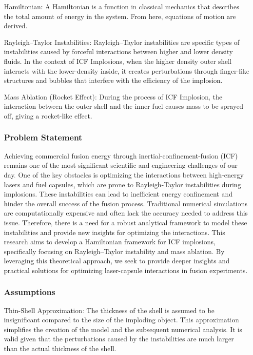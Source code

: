 \par Hamiltonian:
A Hamiltonian is a function in classical mechanics that describes the total amount of energy in the system. From here, equations of motion are derived.

\par Rayleigh--Taylor Instabilities:
Rayleigh--Taylor instabilities are specific types of instabilities caused by forceful interactions between higher and lower density fluids. In the context of ICF Implosions, when the higher density outer shell interacts with the lower-density inside, it creates perturbations through finger-like structures and bubbles that interfere with the efficiency of the implosion.

\par Mass Ablation (Rocket Effect):
During the process of ICF Implosion, the interaction between the outer shell and the inner fuel causes mass to be sprayed off, giving a rocket-like effect.



\subsubsection{Problem Statement}
\par Achieving commercial fusion energy through inertial-confinement-fusion (ICF) remains one of the most significant scientific and engineering challenges of our day. One of the key obstacles is optimizing the interactions between high-energy lasers and fuel capsules, which are prone to Rayleigh-Taylor instabilities during implosions. These instabilities can lead to inefficient energy confinement and hinder the overall success of the fusion process. Traditional numerical simulations are computationally expensive and often lack the accuracy needed to address this issue. Therefore, there is a need for a robust analytical framework to model these instabilities and provide new insights for optimizing the interactions. This research aims to develop a Hamiltonian framework for ICF implosions, specifically focusing on Rayleigh--Taylor instability and mass ablation. By leveraging this theoretical approach, we seek to provide deeper insights and practical solutions for optimizing laser-capsule interactions in fusion experiments.

\subsubsection{Assumptions}
\par Thin-Shell Approximation:
The thickness of the shell is assumed to be insignificant compared to the size of the imploding object. This approximation simplifies the creation of the model and the subsequent numerical analysis. It is valid given that the perturbations caused by the instabilities are much larger than the actual thickness of the shell.

